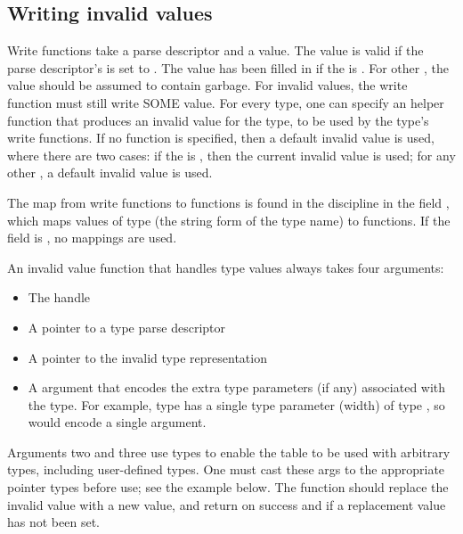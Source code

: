 \subsection{Writing invalid values}
\label{library-customization-writing-invalid}
Write functions take a parse descriptor and a value.  The value is valid if the
parse descriptor's  is set to .  The value
has been filled in if the  is
.  For other , the value
should be assumed to contain garbage.  For invalid values, the write function must still
write SOME value.  For every type, one can specify an  helper function
that produces an invalid value for the type, to be used by the type's write
functions.  If no function is specified, then a default invalid value is used,
where there are two cases: if the  is , then
the current invalid value is used; for any other , a default invalid
value is used.

The map from write functions to  functions is found in
the discipline in the field , which maps
values of type   (the string form of the type name)
to  functions.  If the  field
is , no mappings are used.

An invalid value function that handles type  values always takes
four arguments:
\begin{itemize}
\item The  handle
\item  A pointer to a type  parse descriptor
\item  A pointer to the invalid type  representation
\item  A  argument that encodes the extra type parameters (if any)
      associated with the type.  For example,
      type  has a single type parameter (width) of type ,
      so  would encode a single  argument.
\end{itemize}
 Arguments two and three use  types to enable the table to be used with arbitrary types,
including user-defined types.  One must cast these  args to the appropriate
 pointer types before use; see the example below.  The function should
replace the invalid value with a new value, and return  on
success and  if a replacement value has not been set.

